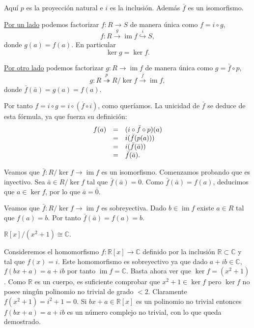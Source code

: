 Aquí \(p\) es la proyección natural e \(i\) es la inclusión. Además
\(\bar f\) es un isomorfismo. 


\protect\hyperlink{factorimage}{Por un lado} podemos factorizar
\(f\colon R\rightarrow S\) de manera única como \(f=i\circ g\),
\[f\colon R\stackrel{g}\rightarrow \operatorname{im} f\stackrel{i}\hookrightarrow S,\]
donde \(g(a)=f(a)\). En particular \[\ker g = \ker f.\]

\protect\hyperlink{factorquotient}{Por otro lado} podemos factorizar
\(g\colon R\rightarrow \operatorname{im} f\) de manera única como
\(g=\bar f\circ p\),
\[g\colon R\stackrel{p}\twoheadrightarrow R/\ker f\stackrel{\overline{f}}\rightarrow \operatorname{im} f,\]
donde \(\bar f(\bar{a})=g(a)=f(a)\).

Por tanto \(f=i\circ g= i\circ(\overline{f}\circ i)\), como queríamos.
La unicidad de \(\bar f\) se deduce de esta fórmula, ya que fuerza su
definición: \[
\begin{array}{rcl}
f(a)&=&(i\circ\bar f\circ p)(a)\cr
&=&i(\bar{f}(p(a)))\cr
&=&i(\bar{f}(\bar{a}))\cr
&=&\bar{f}(\bar{a}).
\end{array}
\]

Veamos que \(\bar f\colon R/\ker f\rightarrow \operatorname{im} f\) es
un isomorfismo. Comenzamos probando que es inyectivo. Sea
\(\bar{a}\in R/\ker f\) tal que \(\bar f(\bar{a})=0\). Como
\(\bar f(\bar{a})=f(a)\), deducimos que \(a\in \ker f\), por lo que
\(\bar{a}=\bar{0}\).

Veamos que \(\bar f\colon R/\ker f\rightarrow \operatorname{im} f\) es
sobreyectiva. Dado \(b\in\operatorname{im} f\) existe \(a\in R\) tal que
\(f(a)=b\). Por tanto \(\bar f(\bar{a})=f(a)=b\).\\


\(\mathbb R[x]/(x^2+1)\cong\mathbb C\). 


Consideremos el homomorfismo
\(f\colon \mathbb R[x]\rightarrow\mathbb C\) definido por la inclusión
\(\mathbb R\subset\mathbb C\) y tal que \(f(x)=i\). Este homomorfismo es
sobreyectivo ya que dado \(a+ib\in\mathbb C\), \(f(bx+a)=a+ib\) por
tanto \(\operatorname{im} f =\mathbb C\). Basta ahora ver que
\(\ker f=(x^2+1)\). Como \(\mathbb R\) es un cuerpo, es suficiente
comprobar que \(x^2+1\in\ker f\) pero \(\ker f\) no posee ningún
polinomio no trivial de grado \(<2\). Claramente \(f(x^2+1)=i^2+1=0\).
Si \(bx+a\in\mathbb{R}[x]\) es un polinomio no trivial entonces
\(f(bx+a)=a+ib\) es un número complejo no trivial, con lo que queda
demostrado. 

